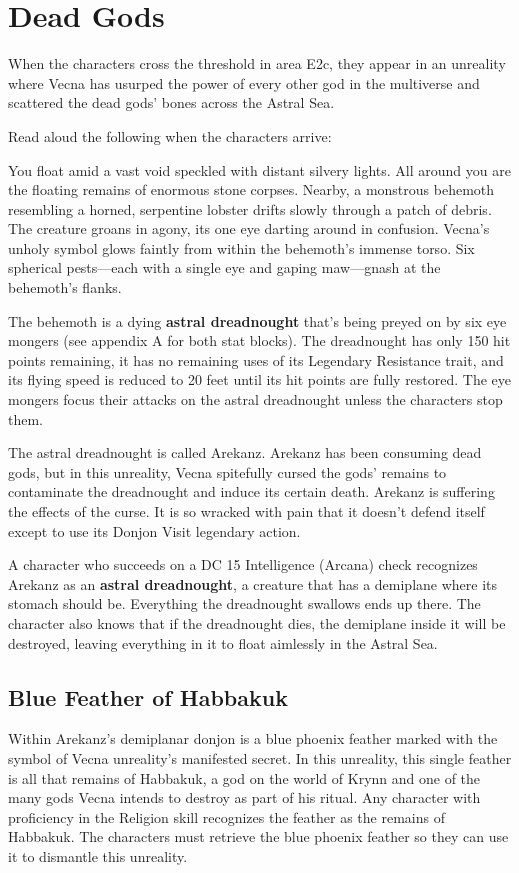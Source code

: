 \documentclass[10pt,a4paper,twoside,bg=print,twocolumn,openany,nodeprecatedcode]{dndbook}
\begin{document}
\section{Dead Gods}
When the characters cross the threshold in area E2c, they appear in an unreality where Vecna has usurped the power of every other god in the multiverse and scattered the dead gods' bones across the Astral Sea.

Read aloud the following when the characters arrive:

\begin{DndReadAloud}{}
You float amid a vast void speckled with distant silvery lights. All around you are the floating remains of enormous stone corpses. Nearby, a monstrous behemoth resembling a horned, serpentine lobster drifts slowly through a patch of debris. The creature groans in agony, its one eye darting around in confusion. Vecna's unholy symbol glows faintly from within the behemoth's immense torso. Six spherical pests—each with a single eye and gaping maw—gnash at the behemoth's flanks.

\end{DndReadAloud}

The behemoth is a dying \textbf{astral dreadnought} that's being preyed on by six eye mongers (see appendix A for both stat blocks). The dreadnought has only 150 hit points remaining, it has no remaining uses of its Legendary Resistance trait, and its flying speed is reduced to 20 feet until its hit points are fully restored. The eye mongers focus their attacks on the astral dreadnought unless the characters stop them.

The astral dreadnought is called Arekanz. Arekanz has been consuming dead gods, but in this unreality, Vecna spitefully cursed the gods' remains to contaminate the dreadnought and induce its certain death. Arekanz is suffering the effects of the curse. It is so wracked with pain that it doesn't defend itself except to use its Donjon Visit legendary action.

A character who succeeds on a DC 15 Intelligence (Arcana) check recognizes Arekanz as an \textbf{astral dreadnought}, a creature that has a demiplane where its stomach should be. Everything the dreadnought swallows ends up there. The character also knows that if the dreadnought dies, the demiplane inside it will be destroyed, leaving everything in it to float aimlessly in the Astral Sea.

\subsection{Blue Feather of Habbakuk}
Within Arekanz's demiplanar donjon is a blue phoenix feather marked with the symbol of Vecna unreality's manifested secret. In this unreality, this single feather is all that remains of Habbakuk, a god on the world of Krynn and one of the many gods Vecna intends to destroy as part of his ritual. Any character with proficiency in the Religion skill recognizes the feather as the remains of Habbakuk. The characters must retrieve the blue phoenix feather so they can use it to dismantle this unreality.
\end{document}
